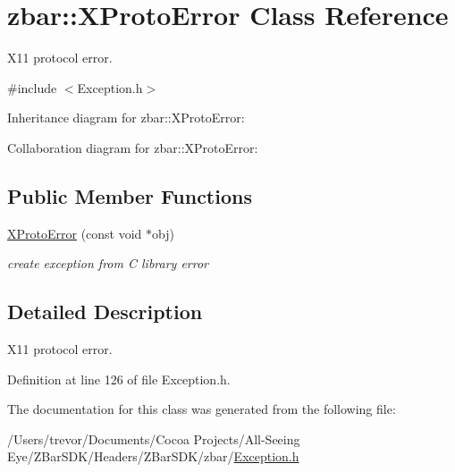 \hypertarget{classzbar_1_1_x_proto_error}{
\section{zbar::XProtoError Class Reference}
\label{classzbar_1_1_x_proto_error}
}


X11 protocol error.  




{\ttfamily \#include $<$Exception.h$>$}



Inheritance diagram for zbar::XProtoError:


Collaboration diagram for zbar::XProtoError:
\subsection*{Public Member Functions}
\begin{DoxyCompactItemize}
\item 
\hypertarget{classzbar_1_1_x_proto_error_a5ca5732776eb746a37a10a416b1794fc}{
\hyperlink{classzbar_1_1_x_proto_error_a5ca5732776eb746a37a10a416b1794fc}{XProtoError} (const void $\ast$obj)}
\label{classzbar_1_1_x_proto_error_a5ca5732776eb746a37a10a416b1794fc}

\begin{DoxyCompactList}\small\item\em create exception from C library error \end{DoxyCompactList}\end{DoxyCompactItemize}


\subsection{Detailed Description}
X11 protocol error. 

Definition at line 126 of file Exception.h.



The documentation for this class was generated from the following file:\begin{DoxyCompactItemize}
\item 
/Users/trevor/Documents/Cocoa Projects/All-\/Seeing Eye/ZBarSDK/Headers/ZBarSDK/zbar/\hyperlink{_exception_8h}{Exception.h}\end{DoxyCompactItemize}
